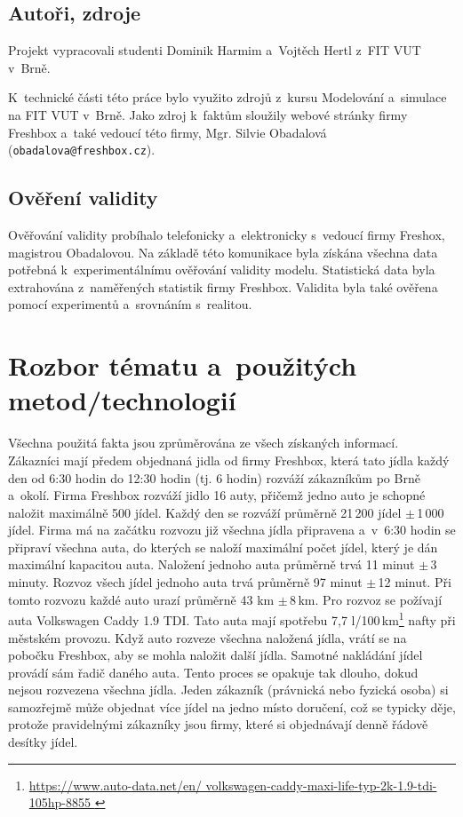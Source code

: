 \documentclass[a4paper, 11pt]{article}
\begin{document}
	\subsection{Autoři, zdroje}

	Projekt vypracovali studenti Dominik Harmim a~Vojtěch Hertl z~FIT VUT
	v~Brně.

	K~technické části této práce bylo využito zdrojů z~kursu Modelování
	a~simulace na FIT VUT v~Brně. Jako zdroj k~faktům sloužily webové stránky
	firmy Freshbox a~také vedoucí této firmy, Mgr. Silvie Obadalová \\
	(\texttt{obadalova@freshbox.cz}).


	\subsection{Ověření validity}

	Ověřování validity \cite[snímek 37]{Freshbox} probíhalo telefonicky
	a~elektronicky s~vedoucí firmy Freshox, magistrou Obadalovou. Na základě
	této komunikace byla získána všechna data potřebná k~experimentálnímu
	ověřování validity modelu. Statistická data byla extrahována z~naměřených
	statistik firmy Freshbox. Validita byla také ověřena pomocí experimentů
	a~srovnáním s~realitou.



	\section{Rozbor tématu a~použitých metod/technologií}

	Všechna použitá fakta jsou zprůměrována ze všech získaných informací. \\

	Zákazníci mají předem objednaná jidla od firmy Freshbox, která tato jídla
	každý den od 6:30 hodin do 12:30 hodin (tj. 6 hodin) rozváží zákazníkům po
	Brně a~okolí. Firma Freshbox rozváží jidlo 16 auty, přičemž jedno auto
	je schopné naložit maximálně 500 jídel. Každý den se rozváží
	průměrně 21\,200 jídel $\pm$\,1\,000 jídel. Firma má na začátku rozvozu
	již všechna jídla připravena a~v~6:30 hodin se připraví všechna auta,
	do kterých se naloží maximální počet jídel, který je dán maximální
	kapacitou auta. Naložení jednoho auta průměrně trvá 11 minut
	$\pm$\,3 minuty. Rozvoz všech jídel jednoho auta trvá průměrně 97 minut
	$\pm$\,12 minut. Při tomto rozvozu každé auto urazí průměrně 43 km
	$\pm$\,8\,km. Pro rozvoz se požívají auta Volkswagen Caddy 1.9 TDI.
	Tato auta mají spotřebu 7,7 l/100\,km\footnote{
		\url{https://www.auto-data.net/en/
			volkswagen-caddy-maxi-life-typ-2k-1.9-tdi-105hp-8855
		}
	} nafty při městském provozu. Když auto rozveze všechna naložená jídla,
	vrátí se na pobočku Freshbox, aby se mohla naložit další jídla. Samotné
	nakládání jídel provádí sám řadič daného auta. Tento proces se opakuje
	tak dlouho, dokud nejsou rozvezena všechna jídla. Jeden zákazník
	(právnická nebo fyzická osoba) si samozřejmě může objednat více jídel na
	jedno místo doručení, což se typicky děje, protože pravidelnými zákazníky
	jsou firmy, které si objednávají denně řádově desítky jídel.
\end{document}

